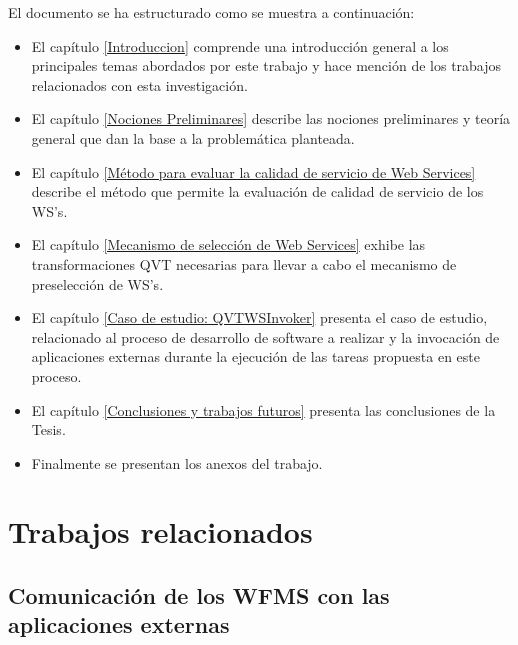 El documento se ha estructurado como se muestra a continuación:
\begin{itemize}
	\item El capítulo \ref{Introduccion} comprende una introducción general a los principales temas abordados por este trabajo y hace mención de los trabajos relacionados con esta investigación.
	
	\item El capítulo \ref{Nociones Preliminares} describe las nociones preliminares y teoría general que dan la base a la problemática planteada.
	
	\item El capítulo \ref{Método para evaluar la calidad de servicio de Web Services} describe el método que permite la evaluación de calidad de servicio de los WS's.
	
	\item El capítulo \ref{Mecanismo de selección de Web Services} exhibe las transformaciones QVT necesarias para llevar a cabo el mecanismo de preselección de WS's. 
	
	\item El capítulo \ref{Caso de estudio: QVTWSInvoker} presenta el caso de estudio, relacionado al proceso de desarrollo de software a realizar y la invocación de aplicaciones externas durante la ejecución de las tareas propuesta en este proceso.
	
	\item El capítulo \ref{Conclusiones y trabajos futuros} presenta las conclusiones de la Tesis.
	
	\item Finalmente se presentan los anexos del trabajo.
	
\end{itemize}

 \section{Trabajos relacionados}
 \label{Trabajos relacionados}
 

\subsection{Comunicación de los WFMS con las aplicaciones externas}
\label{Comunicación de los WFMS con las aplicaciones externas}

